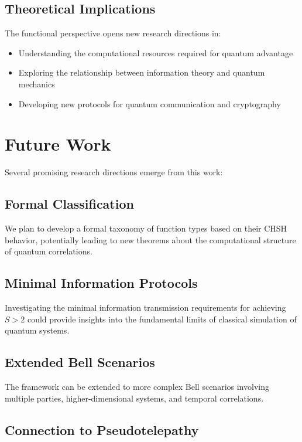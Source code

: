 \documentclass[11pt,a4paper]{article}
\begin{document}
\subsection{Theoretical Implications}

The functional perspective opens new research directions in:

\begin{itemize}
\item Understanding the computational resources required for quantum advantage
\item Exploring the relationship between information theory and quantum mechanics
\item Developing new protocols for quantum communication and cryptography
\end{itemize}

\section{Future Work}

Several promising research directions emerge from this work:

\subsection{Formal Classification}

We plan to develop a formal taxonomy of function types based on their CHSH behavior, potentially leading to new theorems about the computational structure of quantum correlations.

\subsection{Minimal Information Protocols}

Investigating the minimal information transmission requirements for achieving $S > 2$ could provide insights into the fundamental limits of classical simulation of quantum systems.

\subsection{Extended Bell Scenarios}

The framework can be extended to more complex Bell scenarios involving multiple parties, higher-dimensional systems, and temporal correlations.

\subsection{Connection to Pseudotelepathy}
\end{document}

